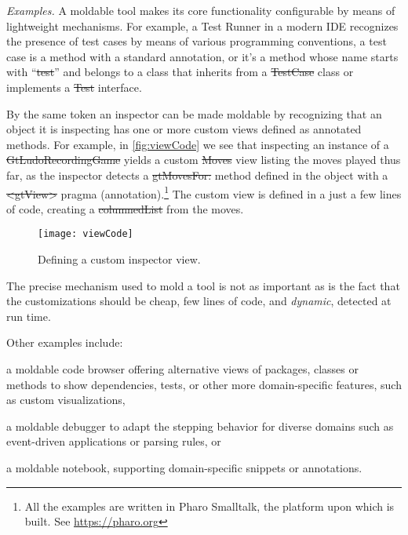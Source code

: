 \documentclass[acmsmall,screen,authorversion,nonacm]{acmart} %
\newcommand\cp[1]{\nbe{Cesare}{#1}{olive}} %
\newcommand{\GT}{\lst{GT}\xspace} %
\newcommand{\patsec}[1]{\noindent\textit{#1.}\xspace}
\begin{document}
\patsec{Examples}
A moldable tool makes its core functionality configurable by means of lightweight mechanisms.
For example, a Test Runner in a modern IDE recognizes the presence of test cases by means of various programming conventions, \ie a test case is a method with a standard annotation, or it's a method whose name starts with ``\st{test}'' and belongs to a class that inherits from a \st{TestCase} class or implements a \st{Test} interface.

By the same token an inspector can be made moldable by recognizing that an object it is inspecting has one or more custom views defined as annotated methods.
For example, in \autoref{fig:viewCode} we see that inspecting an instance of a \st{GtLudoRecordingGame} yields a custom \st{Moves} view listing the moves played thus far, as the inspector detects a \st{gtMovesFor:} method defined in the object with a \st{<gtView>} pragma (\ie annotation).\footnote{All the examples are written in Pharo Smalltalk, the platform upon which \GT is built. See \url{https://pharo.org}}
The custom view is defined in a just a few lines of code, creating a \st{columnedList} from the moves.

\begin{figure}[h]
  \texttt{[image: viewCode]}
  \caption{Defining a custom inspector view.}
  \label{fig:viewCode}
\end{figure}

The precise mechanism used to mold a tool is not as important as is the fact that the customizations should be cheap, \ie few lines of code, and \emph{dynamic}, \ie detected at run time.

Other examples include:
\begin{inparaenum}[(i)]
\item a moldable code browser offering alternative views of packages, classes or methods to show dependencies, tests, or other more domain-specific features, such as custom visualizations,
\item a moldable debugger to adapt the stepping behavior for diverse domains such as event-driven applications or parsing rules, 
or
\item a moldable notebook, supporting domain-specific snippets or annotations.
\end{inparaenum}
\end{document}

